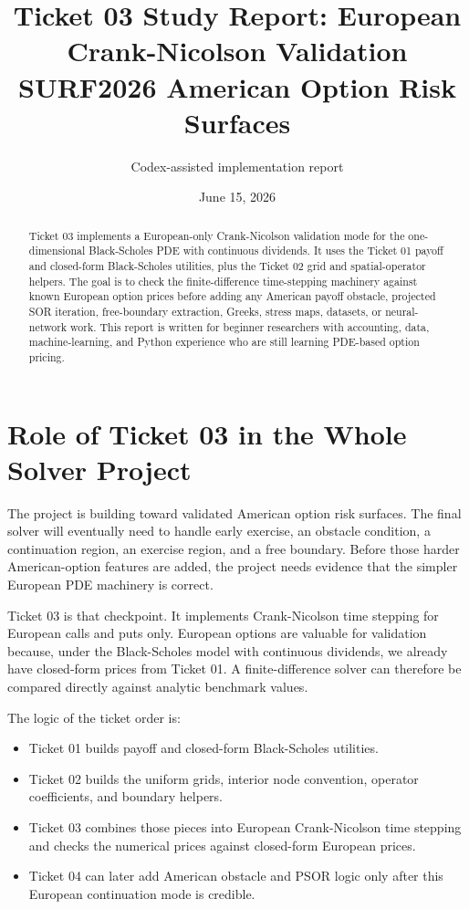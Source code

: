 \documentclass[11pt,a4paper]{article}
\title{\textbf{Ticket 03 Study Report: European Crank-Nicolson Validation}\\
\large SURF2026 American Option Risk Surfaces}
\author{Codex-assisted implementation report}
\date{June 15, 2026}
\begin{document}
\maketitle

\begin{abstract}
Ticket 03 implements a European-only Crank-Nicolson validation mode for the one-dimensional
Black-Scholes PDE with continuous dividends. It uses the Ticket 01 payoff and closed-form
Black-Scholes utilities, plus the Ticket 02 grid and spatial-operator helpers. The goal is to
check the finite-difference time-stepping machinery against known European option prices before
adding any American payoff obstacle, projected SOR iteration, free-boundary extraction, Greeks,
stress maps, datasets, or neural-network work. This report is written for beginner researchers
with accounting, data, machine-learning, and Python experience who are still learning PDE-based
option pricing.
\end{abstract}

\tableofcontents
\newpage

\section{Role of Ticket 03 in the Whole Solver Project}

The project is building toward validated American option risk surfaces. The final solver will
eventually need to handle early exercise, an obstacle condition, a continuation region, an
exercise region, and a free boundary. Before those harder American-option features are added,
the project needs evidence that the simpler European PDE machinery is correct.

Ticket 03 is that checkpoint. It implements Crank-Nicolson time stepping for European calls and
puts only. European options are valuable for validation because, under the Black-Scholes model
with continuous dividends, we already have closed-form prices from Ticket 01. A finite-difference
solver can therefore be compared directly against analytic benchmark values.

The logic of the ticket order is:
\begin{itemize}
  \item Ticket 01 builds payoff and closed-form Black-Scholes utilities.
  \item Ticket 02 builds the uniform grids, interior node convention, operator coefficients,
        and boundary helpers.
  \item Ticket 03 combines those pieces into European Crank-Nicolson time stepping and checks the
        numerical prices against closed-form European prices.
  \item Ticket 04 can later add American obstacle and PSOR logic only after this European
        continuation mode is credible.
\end{itemize}
\end{document}
